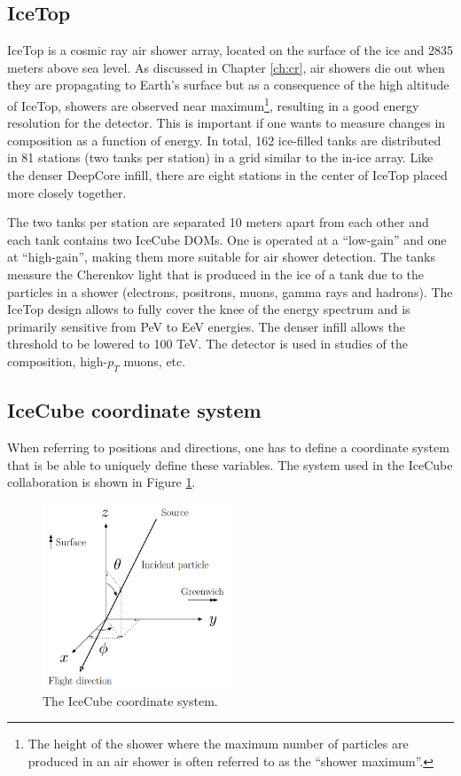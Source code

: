 \subsection{IceTop}
IceTop is a cosmic ray air shower array, located on the surface of the ice and 2835 meters above sea level. As discussed in Chapter \ref{ch:cr}, air showers die out when they are propagating to Earth's surface but as a consequence of the high altitude of IceTop, showers are observed near maximum\footnote{The height of the shower where the maximum number of particles are produced in an air shower is often referred to as the ``shower maximum''.}, resulting in a good energy resolution for the detector. This is important if one wants to measure changes in composition as a function of energy. In total, 162 ice-filled tanks are distributed in 81 stations (two tanks per station) in a grid similar to the in-ice array. Like the denser DeepCore infill, there are eight stations in the center of IceTop placed more closely together. 

The two tanks per station are separated 10 meters apart from each other and each tank contains two IceCube DOMs. One is operated at a ``low-gain'' and one at ``high-gain'', making them more suitable for air shower detection. The tanks measure the Cherenkov light that is produced in the ice of a tank due to the particles in a shower (electrons, positrons, muons, gamma rays and hadrons). The IceTop design allows to fully cover the knee of the energy spectrum and is primarily sensitive from PeV to EeV energies. The denser infill allows the threshold to be lowered to 100 TeV. The detector is used in studies of the composition, high-$p_T$ muons, etc. 

\subsection{IceCube coordinate system}
When referring to positions and directions, one has to define a coordinate system that is be able to uniquely define these variables. The system used in the IceCube collaboration is shown in Figure \ref{fig:coordinates}.\\

\begin{figure}[t]
\centering
\includegraphics[width=0.5\textwidth]{chapter7/img/CoordinateSystem.png}
\caption{The IceCube coordinate system.}
\label{fig:coordinates}
\end{figure}

